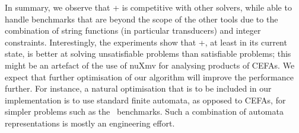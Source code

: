 In summary, we  observe that \ostrich+ is competitive with other solvers, while able to handle benchmarks that are beyond
the scope of the other tools due to the combination of string functions (in particular transducers) and integer
constraints. Interestingly, the experiments show that \ostrich+, at
least in its current state, is better at solving unsatisfiable problems than satisfiable problems; this might be an artefact of the
use of nuXmv for analysing products of CEFAs. We expect that further
optimisation of our algorithm will improve the performance further. %
For instance, a natural optimisation that is to be
included in our implementation is to use standard finite automata, %
as opposed to CEFAs, for simpler problems such as the
\kaluzabench\ benchmarks. Such a combination of automata
representations is mostly an engineering effort.

%




